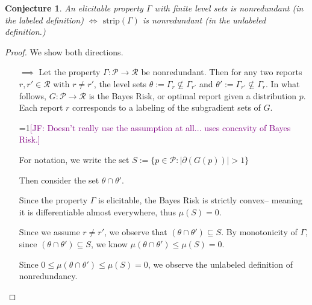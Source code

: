 \documentclass[12pt]{article}
\newcommand{\Comments}{1}
\newcommand{\mynote}[2]{\ifnum\Comments=1\textcolor{#1}{#2}\fi}
\newcommand{\jessie}[1]{\mynote{purple}{[JF: #1]}}
\renewcommand{\P}{\mathcal{P}}
\newcommand{\R}{\mathcal{R}}
\newcommand{\inter}[1]{\mathring{#1}}%
\newcommand{\strip}{\text{strip}}
\newtheorem{conjecture}{Conjecture}
\begin{document}
\begin{conjecture}\label{conj:nonredundant-defs-equivalent}
	An elicitable property $\Gamma$ with finite level sets is nonredundant (in the labeled definition) $\iff$ $\strip(\Gamma)$ is nonredundant (in the unlabeled definition.)
\end{conjecture}
\begin{proof}
	We show both directions.\\
	\begin{enumerate}
		\item [$\implies$]
		Let the property $\Gamma:\P \to \R$ be nonredundant.
		Then for any two reports $r, r' \in \R$ with $r \neq r'$, the level sets $\theta := \Gamma_r \not \subseteq \Gamma_{r'}$ and $\theta' := \Gamma_{r'} \not \subseteq \Gamma_r$.
		In what follows, $G : \P \to \R$ is the Bayes Risk, or optimal report given a distribution $p$.
		Each report $r$ corresponds to a labeling of the subgradient sets of $G$.
		
		\jessie{Doesn't really use the assumption at all... uses concavity of Bayes Risk.}
		
		For notation, we write the set $S := \{p \in \P : |\partial(G(p))| > 1\}$
		
		Then consider the set $\theta \cap \theta'$.
		

		
		Since the property $\Gamma$ is elicitable, the Bayes Risk is strictly convex-- meaning it is differentiable almost everywhere, thus $\mu(S) = 0$.
		
		Since we assume $r \neq r'$, we observe that $(\theta\cap\theta') \subseteq S$.
		By monotonicity of $\Gamma$, since $(\theta\cap\theta') \subseteq S$, we know $\mu(\theta \cap \theta') \leq \mu(S) = 0$.
		

		Since $0 \leq \mu(\theta \cap \theta') \leq \mu(S) = 0$, we observe the unlabeled definition of nonredundancy.
		

\end{enumerate}
\end{proof}
\end{document}
